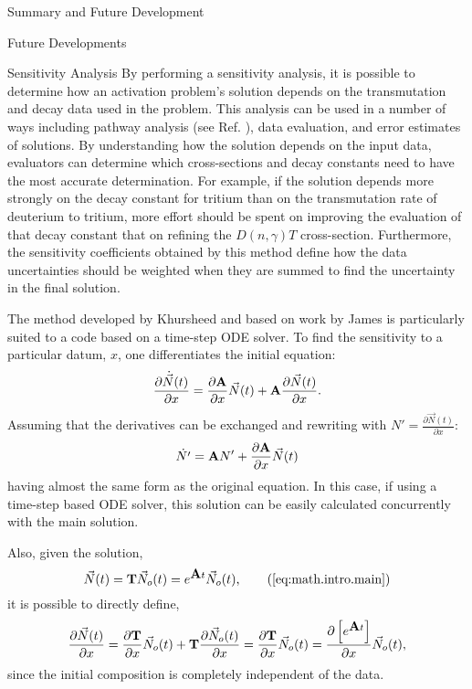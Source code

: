 \begin{chapter}{Summary and Future Development}
\begin{section}{Future Developments}
\begin{subsection}{Sensitivity Analysis}
      By performing a sensitivity analysis, it is possible to
      determine how an activation problem's solution depends on the
      transmutation and decay data used in the problem\cite{sensPhD}.
      This analysis can be used in a number of ways including pathway
      analysis (see Ref. ), data evaluation, and error
      estimates of solutions.  By understanding how the solution
      depends on the input data, evaluators can determine which
      cross-sections and decay constants need to have the most
      accurate determination.  For example, if the solution depends
      more strongly on the decay constant for tritium than on the
      transmutation rate of deuterium to tritium, more effort should
      be spent on improving the evaluation of that decay constant that
      on refining the $D(n,\gamma)T$ cross-section.  Furthermore, the
      sensitivity coefficients obtained by this method define how the
      data uncertainties should be weighted when they are summed to
      find the uncertainty in the final solution.
    
      The method developed by Khursheed\cite{sensPhD} and based on
      work by James\cite{sensJames} is particularly suited to a code
      based on a time-step ODE solver.  To find the sensitivity
      to a particular datum, $x$, one differentiates the initial
      equation:
      \begin{equation*}
        \frac{\partial\dot{\vec{N}}(t)}{\partial x} =
        \frac{\partial\mbox{$\mathbf{A}$}}{\partial x}\vec{N}(t) +
        \mbox{$\mathbf{A}$}\frac{\partial\vec{N}(t)}{\partial x}.
      \end{equation*}
      Assuming that the derivatives can be exchanged and rewriting with $N'
      = \frac{\partial\vec{N}(t)}{\partial x}$:
      \begin{equation}
        \dot{N'} =  \mbox{$\mathbf{A}$}N' + \frac{\partial\mbox{$\mathbf{A}$}}{\partial x}\vec{N}(t)
      \end{equation}
      having almost the same form as the original equation.  In
      this case, if using a time-step based ODE solver, this solution
      can be easily calculated concurrently with the main solution.
    
      Also, given the solution,
      \begin{equation}
        \vec{N}(t) = \mat{T}\vec{N}_o(t) = e^{\mat{A}t}\vec{N}_o(t),\tag{\ref{eq:math.intro.main}}
      \end{equation}
      it is possible to directly define,
      \begin{equation}
        \frac{\partial\vec{N}(t)}{\partial x} =
        \frac{\partial\mbox{$\mathbf{T}$}}{\partial x}\vec{N}_o(t) +
        \mbox{$\mathbf{T}$}\frac{\partial\vec{N}_o(t)}{\partial x} =
        \frac{\partial\mbox{$\mathbf{T}$}}{\partial x}\vec{N}_o(t) = 
        \frac{\partial \left[ e^{\mbox{$\mathbf{A}$}t}\right]}{\partial x}\vec{N}_o(t),
      \end{equation}
      since the initial composition is completely independent of the data.
      

\end{subsection}
\end{section}
\end{chapter}
